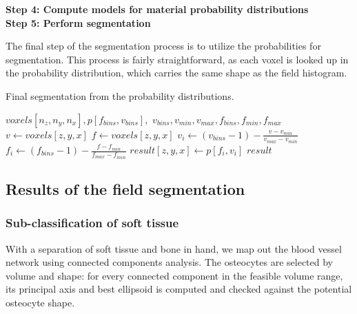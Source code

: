 \vspace{\baselineskip}
\noindent\textbf{Step 4: Compute models for material probability distributions} \\


\vspace{\baselineskip}
\noindent\textbf{Step 5: Perform segmentation}

The final step of the segmentation process is to utilize the probabilities for segmentation.
This process is fairly straightforward, as each voxel is looked up in the probability distribution, which carries the same shape as the field histogram.

\begin{algorithm}
    \caption{Final segmentation from the probability distributions.}
    \label{alg:segment}
    \begin{algorithmic}
         {$voxels[n_z,n_y,n_x], p[f_{bins},v_{bins}],$ \newline $v_{bins}, v_{min}, v_{max}, f_{bins}, f_{min}, f_{max}$}
                \State $v \gets voxels[z,y,x]$
                    \State $f \gets voxels[z,y,x]$
                        \State $v_i \gets (v_{bins} - 1) - \frac{v - v_{min}}{v_{max} - v_{min}}$
                        \State $f_i \gets (f_{bins} - 1) - \frac{f - f_{min}}{f_{max} - f_{min}}$
                        \State $result[z,y,x] \gets p[f_i, v_i]$
                    \EndIf
                \EndIf
            \EndFor
            \Return $result$
        \EndFunction
    \end{algorithmic}
\end{algorithm}

\subsection{Results of the field segmentation}

\subsubsection{Sub-classification of soft tissue}

With a separation of soft tissue and bone in hand, we 
map out the blood vessel network using connected components analysis. 
The osteocytes are selected by volume and shape: for every connected
component in the feasible volume range, its principal axis and best
ellipsoid is computed and checked against the potential osteocyte shape.

